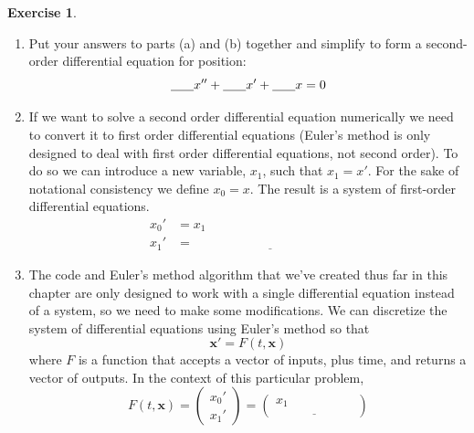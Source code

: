 \documentclass[
]{book}
\providecommand{\tightlist}{%
  \setlength{\itemsep}{0pt}\setlength{\parskip}{0pt}}
\theoremstyle{definition}
\theoremstyle{definition}
\theoremstyle{definition}
\newtheorem{exercise}{Exercise}[chapter]
\theoremstyle{remark}
\begin{document}
\begin{exercise}
\begin{enumerate}
  \begin{enumerate}
  \def\labelenumii{\roman{enumii}.}
  \tightlist
  \item
    \(F_{restoring} = bx\): The damping force is proportional to the displacement away from equilibrium.
  \item
    \(F_{restoring} = bx'\): The damping force is proportional to the velocity of the mass.
  \item
    \(F_{restoring} = bx''\): The damping force is proportional to the acceleration of thte mass.
  \end{enumerate}
\item
  Put your answers to parts (a) and (b) together and simplify to form a second-order differential equation for position:
  \[ \underline{\hspace{0.25in}} x'' + \underline{\hspace{0.25in}} x' + \underline{\hspace{0.25in}} x = 0 \]
\item
  If we want to solve a second order differential equation numerically we need to convert it to first order differential equations (Euler's method is only designed to deal with first order differential equations, not second order). To do so we can introduce a new variable, \(x_1\), such that \(x_1 = x'\). For the sake of notational consistency we define \(x_0 = x\). The result is a system of first-order differential equations.
  \[\begin{aligned} x_0' &= x_1 \\ x_1' &= \underline{\hspace{2in}} \end{aligned}\]
\item
  The code and Euler's method algorithm that we've created thus far in this chapter are only designed to work with a single differential equation instead of a system, so we need to make some modifications. We can discretize the system of differential equations using Euler's method so that
  \[ \boldsymbol{x}' = F(t,\boldsymbol{x}) \]
  where \(F\) is a function that accepts a vector of inputs, plus time, and returns a vector of outputs. In the context of this particular problem,
  \[ F(t,\boldsymbol{x}) = \begin{pmatrix} x_0' \\ x_1' \end{pmatrix} = \begin{pmatrix} x_1 \\ \underline{\hspace{1in}} \end{pmatrix} \]

\end{enumerate}
\end{exercise}
\end{document}
